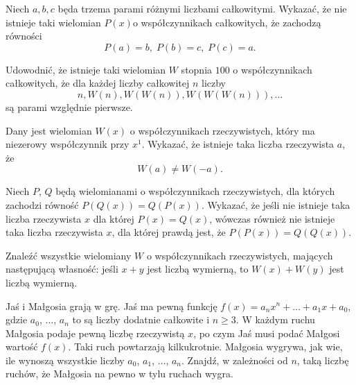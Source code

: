 \begin{problem}{1}
	Niech $a,b,c$ będa trzema parami różnymi liczbami całkowitymi. Wykazać, że nie istnieje taki wielomian $P(x)$o współczynnikach całkowitych, że zachodzą równości
    \[
        P(a) = b,\; P(b) = c,\; P(c) = a.
    \]
\end{problem}

\begin{problem}{2}
	Udowodnić, że istnieje taki wielomian $W$ stopnia $100$ o współczynnikach całkowitych, że dla każdej liczby całkowitej $n$ liczby
	\[
		n, W(n), W(W(n)), W(W(W(n))), ...
	\]
	są parami względnie pierwsze.
\end{problem}

\begin{problem}{3}
	Dany jest wielomian $W(x)$ o współczynnikach rzeczywistych, który ma niezerowy współczynnik przy $x^1$. Wykazać, że istnieje taka liczba rzeczywista $a$, że
	\[
		W(a) \neq W(-a).
	\]
\end{problem}

\begin{problem}{4}
	Niech $P$, $Q$ będą wielomianami o współczynnikach rzeczywistych, dla których zachodzi równość $P(Q(x)) = Q(P(x))$. Wykazać, że jeśli nie istnieje taka liczba rzeczywista $x$ dla której $P(x) = Q(x)$, wówczas również nie istnieje taka liczba rzeczywista $x$, dla której prawdą jest, że $P(P(x)) = Q(Q(x))$.
\end{problem}

\begin{problem}{5}
	Znaleźć wszystkie wielomiany $W$ o współczynnikach rzeczywistych, mających następującą własność:
	jeśli $x + y$ jest liczbą wymierną, to $W(x) + W(y)$ jest liczbą wymierną.
\end{problem}

\begin{problem}{6}
	Jaś i Małgosia grają w grę. Jaś ma pewną funkcję $f(x)=a_n x^n + \dots + a_1x+a_0$, gdzie $a_0$, $\dots$, $a_n$ to są liczby dodatnie całkowite i $n\geqslant 3$. W każdym ruchu Małgosia podaje pewną liczbę rzeczywistą $x$, po czym Jaś musi podać Małgosi wartość $f(x).$ Taki ruch powtarzają kilkukrotnie. Małgosia wygrywa, jak wie, ile wynoszą wszystkie liczby $a_0$, $a_1$, $\dots$, $a_n.$ Znajdź, w zależności od $n$, taką liczbę ruchów, że Małgosia na pewno w tylu ruchach wygra.
\end{problem}

